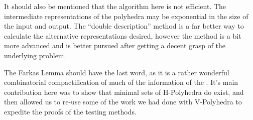 It should also be mentioned that the algorithm here is not efficient.  The intermediate representations of the polyhedra may be exponential in the size of the input and output.  The ``double description'' method is a far better way to calculate the alternative representations desired, however the method is a bit more advanced and is better pursued after getting a decent grasp of the underlying problem.

The Farkas Lemma should have the last word, as it is a rather wonderful combinatorial compactification of much of the information of the \MWT.  It's main contribution here was to show that minimal sets of H-Polyhedra do exist, and then allowed us to re-use some of the work we had done with V-Polyhedra to expedite the proofs of the testing methods.
